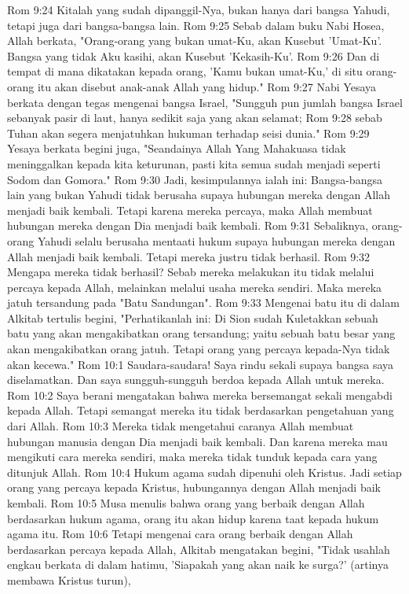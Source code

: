 Rom 9:24  Kitalah yang sudah dipanggil-Nya, bukan hanya dari bangsa Yahudi, tetapi juga dari bangsa-bangsa lain.
Rom 9:25  Sebab dalam buku Nabi Hosea, Allah berkata, "Orang-orang yang bukan umat-Ku, akan Kusebut 'Umat-Ku'. Bangsa yang tidak Aku kasihi, akan Kusebut 'Kekasih-Ku'.
Rom 9:26  Dan di tempat di mana dikatakan kepada orang, 'Kamu bukan umat-Ku,' di situ orang-orang itu akan disebut anak-anak Allah yang hidup."
Rom 9:27  Nabi Yesaya berkata dengan tegas mengenai bangsa Israel, "Sungguh pun jumlah bangsa Israel sebanyak pasir di laut, hanya sedikit saja yang akan selamat;
Rom 9:28  sebab Tuhan akan segera menjatuhkan hukuman terhadap seisi dunia."
Rom 9:29  Yesaya berkata begini juga, "Seandainya Allah Yang Mahakuasa tidak meninggalkan kepada kita keturunan, pasti kita semua sudah menjadi seperti Sodom dan Gomora."
Rom 9:30  Jadi, kesimpulannya ialah ini: Bangsa-bangsa lain yang bukan Yahudi tidak berusaha supaya hubungan mereka dengan Allah menjadi baik kembali. Tetapi karena mereka percaya, maka Allah membuat hubungan mereka dengan Dia menjadi baik kembali.
Rom 9:31  Sebaliknya, orang-orang Yahudi selalu berusaha mentaati hukum supaya hubungan mereka dengan Allah menjadi baik kembali. Tetapi mereka justru tidak berhasil.
Rom 9:32  Mengapa mereka tidak berhasil? Sebab mereka melakukan itu tidak melalui percaya kepada Allah, melainkan melalui usaha mereka sendiri. Maka mereka jatuh tersandung pada "Batu Sandungan".
Rom 9:33  Mengenai batu itu di dalam Alkitab tertulis begini, "Perhatikanlah ini: Di Sion sudah Kuletakkan sebuah batu yang akan mengakibatkan orang tersandung; yaitu sebuah batu besar yang akan mengakibatkan orang jatuh. Tetapi orang yang percaya kepada-Nya tidak akan kecewa."
Rom 10:1  Saudara-saudara! Saya rindu sekali supaya bangsa saya diselamatkan. Dan saya sungguh-sungguh berdoa kepada Allah untuk mereka.
Rom 10:2  Saya berani mengatakan bahwa mereka bersemangat sekali mengabdi kepada Allah. Tetapi semangat mereka itu tidak berdasarkan pengetahuan yang dari Allah.
Rom 10:3  Mereka tidak mengetahui caranya Allah membuat hubungan manusia dengan Dia menjadi baik kembali. Dan karena mereka mau mengikuti cara mereka sendiri, maka mereka tidak tunduk kepada cara yang ditunjuk Allah.
Rom 10:4  Hukum agama sudah dipenuhi oleh Kristus. Jadi setiap orang yang percaya kepada Kristus, hubungannya dengan Allah menjadi baik kembali.
Rom 10:5  Musa menulis bahwa orang yang berbaik dengan Allah berdasarkan hukum agama, orang itu akan hidup karena taat kepada hukum agama itu.
Rom 10:6  Tetapi mengenai cara orang berbaik dengan Allah berdasarkan percaya kepada Allah, Alkitab mengatakan begini, "Tidak usahlah engkau berkata di dalam hatimu, 'Siapakah yang akan naik ke surga?' (artinya membawa Kristus turun),
